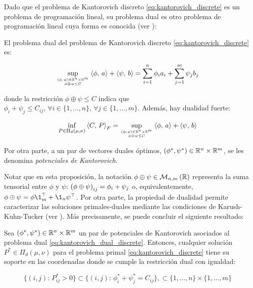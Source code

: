 Dado que el problema de Kantorovich discreto \eqref{eq:kantorovich_discrete} es un problema de programación lineal, su problema dual es otro problema de programación lineal cuya forma es conocida (ver \cite{boyd2004convex}):

\begin{prop}
	\label{prop:duality_discrete}
	El problema dual del problema de Kantorovich discreto \eqref{eq:kantorovich_discrete} es:

	\begin{equation}
		\label{eq:kantorovich_dual_discrete}
		\sup_{\feasible{(\phi,\psi)\in\R^n\times\R^m} {\phi\oplus \psi \leq C}}
		\dotproduct{\phi}{a} + \dotproduct{\psi}{b} = \sum_{i=1}^n \phi_i a_i + \sum_{j=1}^m \psi_j b_j
	\end{equation}

	donde la restricción $\phi\oplus \psi \leq C$ indica que $\phi_i+\psi_j \leq C_{ij}, \, \forall i\in\{1,\ldots,n\}, \, \forall j\in\{1,\ldots,m\}$. Además, hay dualidad fuerte:

	\begin{equation}
		\label{eq:kantorovich_strong_duality_discrete}
		\inf_{P\in \Pi_d(\mu,\nu)} \dotproduct{C}{P}_F
		= \sup_{\feasible{(\phi,\psi)\in\R^n\times\R^m}{\phi\oplus \psi \leq C}}
		\dotproduct{\phi}{a} + \dotproduct{\psi}{b}
	\end{equation}

	Por otra parte, a un par de vectores duales óptimos, $(\phi^*,\psi^*)\in\mathbb{R}^n\times\mathbb{R}^m$, se les denomina \textit{potenciales de Kantorovich}.
\end{prop}

Notar que en esta proposición, la notación $\phi\oplus\psi\in\mathcal{M}_{n,m}\left(\mathbb{R}\right)$ representa la suma tensorial entre $\phi$ y $\psi$: $\left(\phi\oplus\psi\right)_{ij}=\phi_i+\psi_j$ o, equivalentemente, $\phi\oplus\psi = \phi\1_m^\top + \1_n \psi^\top$. Por otra parte, la propiedad de dualidad permite caracterizar las soluciones primales-duales mediante las condiciones de Karush-Kuhn-Tucker (ver \cite{boyd2004convex}). Más precisamente, se puede concluir el siguiente resultado:

\begin{cor}
	Sea $(\phi^*,\psi^*)\in\mathbb{R}^n\times\mathbb{R}^m$ un par de potenciales de Kantorovich asociados al problema dual \eqref{eq:kantorovich_dual_discrete}. Entonces, cualquier solución $P^*\in\Pi_d(\mu,\nu)$ para el problema primal \eqref{eq:kantorovich_discrete} tiene su soporte en las coordenadas donde se cumple la restricción dual con igualdad:

	\begin{equation*}
		\{(i,j):\,P_{ij}^*>0\}
		\subset \{(i,j):\, \phi^*_i + \psi^*_j = C_{ij}\},
		\subset \{1,\ldots,n\}\times\{1,\ldots,m\}
	\end{equation*}

\end{cor}

